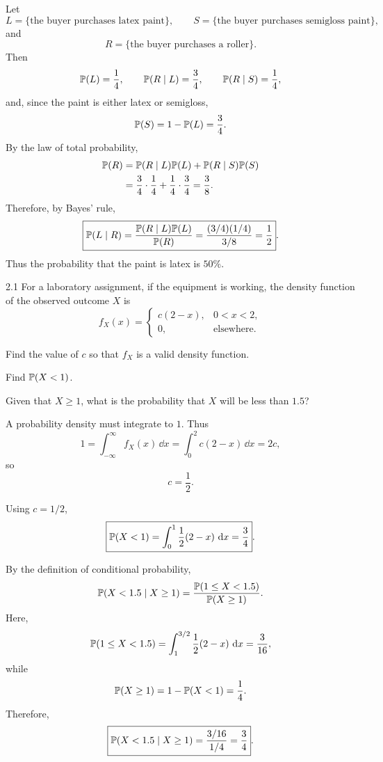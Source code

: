 \documentclass[11pt,oneside]{article}
\begin{document}
\begin{solution}
Let
\[
    L=\{\text{the buyer purchases latex paint}\},\qquad
    S=\{\text{the buyer purchases semigloss paint}\},
\]
and
\[
    R=\{\text{the buyer purchases a roller}\}.
\]
Then
\[
    \mathbb{P}(L)=\frac14,
    \qquad
    \mathbb{P}(R\mid L)=\frac34,
    \qquad
    \mathbb{P}(R\mid S)=\frac14,
\]
and, since the paint is either latex or semigloss,
\[
    \mathbb{P}(S)=1-\mathbb{P}(L)=\frac34.
\]
By the law of total probability,
\[
\begin{aligned}
    \mathbb{P}(R)
    &=\mathbb{P}(R\mid L)\mathbb{P}(L)+\mathbb{P}(R\mid S)\mathbb{P}(S)\\
    &=\frac34\cdot\frac14+\frac14\cdot\frac34
      =\frac38.
\end{aligned}
\]
Therefore, by Bayes' rule,
\[
    \boxed{
    \mathbb{P}(L\mid R)
    =\frac{\mathbb{P}(R\mid L)\mathbb{P}(L)}{\mathbb{P}(R)}
    =\frac{(3/4)(1/4)}{3/8}
    =\frac12
    }.
\]
Thus the probability that the paint is latex is $50\%$.
\end{solution}

\begin{problem}{2.1}
For a laboratory assignment, if the equipment is working, the density function of the observed outcome $X$ is
\[
    f_X(x)=
    \begin{cases}
        c(2-x), & 0<x<2,\\
        0, & \text{elsewhere}.
    \end{cases}
\]
\begin{problemsubparts}
    \item Find the value of $c$ so that $f_X$ is a valid density function.
    \item Find $\mathbb{P}(X<1)$.
    \item Given that $X\geq1$, what is the probability that $X$ will be less than $1.5$?
\end{problemsubparts}
\end{problem}

\begin{solution}
\begin{problemsubparts}
    \item A probability density must integrate to $1$. Thus
    \[
        1=\int_{-\infty}^{\infty}f_X(x)\,\dd x
        =\int_0^2 c(2-x)\,\dd x
        =2c,
    \]
    so
    \[
        \boxed{c=\frac12}.
    \]

    \item Using $c=1/2$,
    \[
        \boxed{
        \mathbb{P}(X<1)
        =\int_0^1 \frac12(2-x)\,\mathop{}\!\mathrm{d} x
        =\frac34
        }.
    \]

    \item By the definition of conditional probability,
    \[
        \mathbb{P}(X<1.5\mid X\geq1)
        =\frac{\mathbb{P}(1\leq X<1.5)}{\mathbb{P}(X\geq1)}.
    \]
    Here,
    \[
        \mathbb{P}(1\leq X<1.5)
        =\int_1^{3/2}\frac12(2-x)\,\mathop{}\!\mathrm{d} x
        =\frac3{16},
    \]
    while
    \[
        \mathbb{P}(X\geq1)=1-\mathbb{P}(X<1)=\frac14.
    \]
    Therefore,
    \[
        \boxed{\mathbb{P}(X<1.5\mid X\geq1)=\frac{3/16}{1/4}=\frac34}.
    \]
\end{problemsubparts}
\end{solution}
\end{document}
